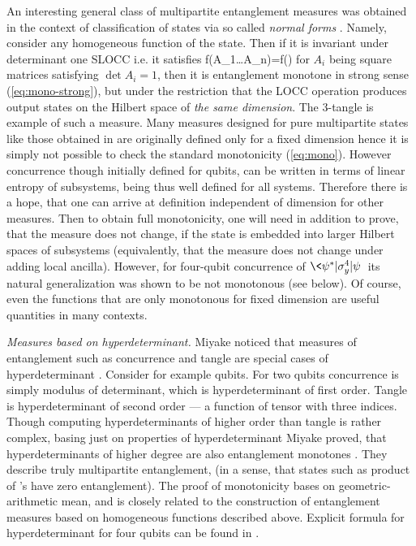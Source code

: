 \documentclass[twocolumn,aps,rmp]{revtex4}
\begin{document}
An interesting general class of multipartite entanglement measures was
obtained in the context of classification of states via
so called {\it normal forms} \cite{VerstraeteDM2001-normal}.
Namely, consider any homogeneous function of the state. Then if it is
invariant under determinant one SLOCC i.e. it satisfies
\be
f(A_1\ot \ldots A_n\psi)=f(\psi)
\ee
for $A_i$ being square matrices satisfying $\det A_i=1$,
then it is entanglement monotone in strong sense
(\ref{eq:mono-strong}), but under the restriction that the LOCC operation
produces output states on the Hilbert space of {\it the same dimension}.
The 3-tangle is example of such a measure.
Many measures designed for pure multipartite states like those
obtained in \cite{OsterlohS2005-filters,Miyake2002-hyper,
WongC2000-multi,Akhtarshenas2003-multiconc} are originally defined only for
a fixed dimension hence it is simply not possible to check the
standard monotonicity (\ref{eq:mono}).
However concurrence  though initially defined for qubits, can be  written in
terms of linear entropy of subsystems, being thus well defined for
all systems. Therefore there is a hope, that one can arrive at definition
independent of dimension for other measures. Then to obtain full
monotonicity, one will need in addition to prove, that  the measure
does not change, if the state is embedded into larger Hilbert spaces
of subsystems (equivalently, that the measure does not change under
adding local ancilla). However, for four-qubit concurrence of
\cite{WongC2000-multi} $\<\psi^*|\sigma_y^4|\psi\>$
its  natural generalization was shown to be not monotonous \cite{DemkowiczBKM2006-multi} (see below).
Of course, even the functions that are only  monotonous for
fixed dimension are useful quantities in many contexts.




{\it Measures based on hyperdeterminant.} Miyake noticed that
measures of entanglement such as concurrence and tangle are special
cases of hyperdeterminant \cite{Miyake2002-hyper}. Consider for
example qubits. For two qubits concurrence is simply modulus of
determinant, which is hyperdeterminant of first order. Tangle is
hyperdeterminant of second order --- a function of tensor with three
indices. Though computing hyperdeterminants of higher order than
tangle is rather complex, basing just on properties of
hyperdeterminant Miyake proved, that hyperdeterminants of higher
degree are also entanglement monotones \cite{Miyake2004-slocc}. They
describe truly multipartite entanglement, (in a sense, that states
such as product of \epr's have zero entanglement). The proof of
monotonicity bases on geometric-arithmetic mean, and is closely
related to the construction of entanglement measures based on
homogeneous functions  described above. Explicit formula
for hyperdeterminant for four qubits can be found in
\cite{Levay2006-4qubits}.
\end{document}
